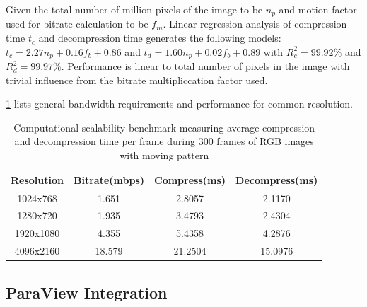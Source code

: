 \documentclass{vgtc}                          %
\begin{document}
Given the total number of million pixels of the image to be \(n_p\) and motion factor used for bitrate calculation to be \(f_m\). Linear regression analysis of compression time \(t_c\) and decompression time generates the following models: \(t_c=2.27n_p+0.16f_b+0.86\) and \(t_d=1.60n_p+0.02f_b+0.89\) with \(R^2_c=99.92\%\) and \(R^2_d=99.97\%\). Performance is linear to total number of pixels in the image with trivial influence from the bitrate multipliccation factor used.
%


\cref{tab:experiment_setup} lists general bandwidth requirements and performance for common resolution. 

\begin{table}[h]
  \caption{Computational scalability benchmark measuring average compression and decompression time per frame during 300 frames of RGB images with moving pattern}
  \label{tab:experiment_setup}
  \scriptsize
  \begin{center}
    \begin{tabular}{cccc}
      Resolution & Bitrate(mbps) & Compress(ms) & Decompress(ms)\\
    \hline
      1024x768 & 1.651 & 2.8057 & 2.1170\\
      1280x720 & 1.935 & 3.4793 & 2.4304\\
      1920x1080 & 4.355 & 5.4358 & 4.2876\\
      4096x2160 & 18.579 & 21.2504 & 15.0976
    \end{tabular}
  \end{center}
\end{table}

\subsection{ParaView Integration}
\end{document}
